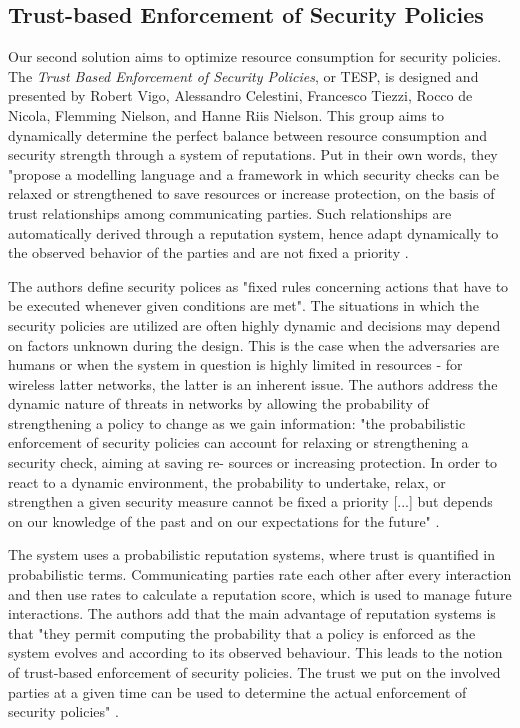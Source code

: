 \documentclass[12pt,a4paper,twoside]{report}
\begin{document}
\subsection{Trust-based Enforcement of Security Policies}
Our second solution aims to optimize resource consumption for security policies. The \emph{Trust Based Enforcement of Security Policies}, or TESP, is designed and presented by Robert Vigo, Alessandro Celestini, Francesco Tiezzi, Rocco de Nicola, Flemming Nielson, and Hanne Riis Nielson\cite{vigo;etal:2014}. This group aims to dynamically determine the perfect balance between resource consumption and security strength through a system of reputations. Put in their own words, they "propose a modelling language and a framework in which security checks can be relaxed or strengthened to save resources or increase protection, on the basis of trust relationships among communicating parties. Such relationships are automatically derived through a reputation system, hence adapt dynamically to the observed behavior of the parties and are not fixed a priority \cite{vigo;etal:2014}.\par
The authors define security polices as "fixed rules concerning actions that have to be executed whenever given conditions are met". The situations in which the security policies are utilized are often highly dynamic and decisions may depend on factors unknown during the design. This is the case when the adversaries are humans or when the system in question is highly limited in resources - for wireless latter networks, the latter is an inherent issue. The authors address the dynamic nature of threats in networks by allowing the probability of strengthening a policy to change as we gain information: "the probabilistic enforcement of security policies can account for relaxing or strengthening a security check, aiming at saving re- sources or increasing protection. In order to react to a dynamic environment, the probability to undertake, relax, or strengthen a given security measure cannot be fixed a priority [...] but depends on our knowledge of the past and on our expectations for the future" \cite{vigo;etal:2014}.\par
The system uses a probabilistic reputation systems, where trust is quantified in probabilistic terms. Communicating parties rate each other after every interaction and then use rates to calculate a reputation score, which is used to manage future interactions. The authors add that the main advantage of reputation systems is that "they permit computing the probability that a policy is enforced as the system evolves and according to its observed behaviour. This leads to the notion of trust-based enforcement of security policies. The trust we put on the involved parties at a given time can be used to determine the actual enforcement of security policies" \cite{vigo;etal:2014}.\par
\end{document}
